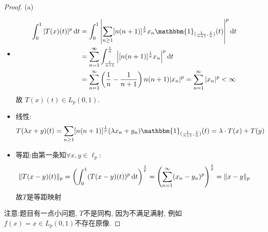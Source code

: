 \begin{proof}
    (a)
    \begin{itemize}
    \item \[\begin{split}\int_0^1|T(x)(t)|^p\diff t
    &=\int_0^1\left|\sum_{n\geq 1}[n(n+1)]^{\frac{1}{p}}x_n\mathbbm{1}_{(\frac{1}{n+1},\frac{1}{n})}(t)\right|^p\diff t\\
    &=\sum_{n=1}^{\infty}\int_{\frac{1}{n+1}}^{\frac{1}{n}}\left|[n(n+1)]^{\frac{1}{p}}x_n\right|^p\diff t\\
    &=\sum_{n=1}^{\infty}\left(\frac{1}{n}-\frac{1}{n+1}\right)n(n+1)|x_n|^p=\sum_{n=1}^{\infty}|x_n|^p<\infty
    \end{split}\]
    故 $T(x)(t)\in L_p(0,1)$.
    \item 线性:
        \[T(\lambda x+y)(t)=\sum_{n\geq 1}[n(n+1)]^{\frac{1}{p}}
        (\lambda x_n+y_n)\mathbbm{1}_{(\frac{1}{n+1},\frac{1}{n})}(t)
        = \lambda\cdot T(x)+T(y)\]
    \item 等距:由第一条知$\forall x,y\in\ell_p$:
    \[\|T(x-y)(t)\|_p=\left(\int_0^1(T(x-y)(t))^p\mathop{}\!\mathrm{d} t\right)^{\frac{1}{p}}=\left(\sum_{n=1}^{\infty}(x_n-y_n)^p\right)^{\frac{1}{p}}=\|x-y\|_p\]故$T$是等距映射
    \end{itemize}
    注意:题目有一点小问题, $T$不是同构, 因为不满足满射, 例如 $f(x)=x\in L_p(0,1)$不存在原像.


\end{proof}

